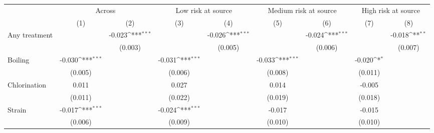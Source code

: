 {
\def\sym#1{\ifmmode^{#1}\else\(^{#1}\)\fi}
\begin{tabular}{l*{8}{c}}
\hline\hline
                    &\multicolumn{2}{c}{Across}                 &\multicolumn{2}{c}{Low risk at source}     &\multicolumn{2}{c}{Medium risk at source}  &\multicolumn{2}{c}{High risk at source}    \\\cmidrule(lr){2-3}\cmidrule(lr){4-5}\cmidrule(lr){6-7}\cmidrule(lr){8-9}
                    &\multicolumn{1}{c}{(1)}         &\multicolumn{1}{c}{(2)}         &\multicolumn{1}{c}{(3)}         &\multicolumn{1}{c}{(4)}         &\multicolumn{1}{c}{(5)}         &\multicolumn{1}{c}{(6)}         &\multicolumn{1}{c}{(7)}         &\multicolumn{1}{c}{(8)}         \\
\hline
Any treatment &                     &      -0.023\sym{***}&                     &      -0.026\sym{***}&                     &      -0.024\sym{***}&                     &      -0.018\sym{**} \\
                    &                     &     (0.003)         &                     &     (0.005)         &                     &     (0.006)         &                     &     (0.007)         \\
Boiling             &      -0.030\sym{***}&                     &      -0.031\sym{***}&                     &      -0.033\sym{***}&                     &      -0.020\sym{*}  &                     \\
                    &     (0.005)         &                     &     (0.006)         &                     &     (0.008)         &                     &     (0.011)         &                     \\
Chlorination        &       0.011         &                     &       0.027         &                     &       0.014         &                     &      -0.005         &                     \\
                    &     (0.011)         &                     &     (0.022)         &                     &     (0.019)         &                     &     (0.018)         &                     \\
Strain              &      -0.017\sym{***}&                     &      -0.024\sym{***}&                     &      -0.017         &                     &      -0.015         &                     \\
                    &     (0.006)         &                     &     (0.009)         &                     &     (0.010)         &                     &     (0.010)         &                     \\

\end{tabular}}
